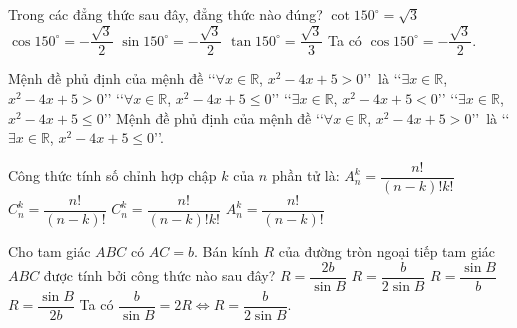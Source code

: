 \begin{ex}
\begin{ex}%
	Trong các đẳng thức sau đây, đẳng thức nào đúng?
	\choice
	{$\cot 150^\circ=\sqrt 3$}
	{\True $\cos 150^\circ=-\dfrac{\sqrt 3}{2}$}
	{$\sin 150^\circ=-\dfrac{\sqrt 3}{2}$}
	{$\tan 150^\circ=\dfrac{\sqrt 3}{3}$}
	\loigiai
	{
		Ta có $\cos 150^\circ=-\dfrac{\sqrt 3}{2}$.
	}
\end{ex}

\begin{ex}%
	Mệnh đề phủ định của mệnh đề \lq\lq $\forall x\in\mathbb{R}$, $x^2-4x+5>0$\rq\rq\ là
	\choice
	{\lq\lq $\exists x\in\mathbb{R}$, $x^2-4x+5>0$\rq\rq}
	{\lq\lq $\forall x\in\mathbb{R}$, $x^2-4x+5\leq 0$\rq\rq}
	{\lq\lq $\exists x\in\mathbb{R}$, $x^2-4x+5<0$\rq\rq}
	{\True \lq\lq $\exists x\in\mathbb{R}$, $x^2-4x+5\leq 0$\rq\rq}
	\loigiai
	{
		Mệnh đề phủ định của mệnh đề \lq\lq $\forall x\in\mathbb{R}$, $x^2-4x+5>0$\rq\rq\ là \lq\lq $\exists x\in\mathbb{R}$, $x^2-4x+5\leq 0$\rq\rq.
	}
\end{ex}

\begin{ex}%
Công thức tính số chỉnh hợp chập $k$ của $n$ phần tử là:
\choice
{$A_n^k=\dfrac{n!}{\left(n-k\right)!k!}$}
{$C_n^k=\dfrac{n!}{\left(n-k\right)!}$}
{$C_n^k=\dfrac{n!}{\left(n-k\right)!k!}$}
{\True $A_n^k=\dfrac{n!}{\left(n-k\right)!}$}
\end{ex}
\begin{ex}%
	Cho tam giác $ABC$ có $AC=b$. Bán kính $R$ của đường tròn ngoại tiếp tam giác $ABC$ được tính bởi công thức nào sau đây?
	\choice
	{$R=\dfrac{2b}{\sin B}$}
	{\True $R=\dfrac{b}{2\sin B}$}
	{$R=\dfrac{\sin B}{b}$}
	{$R=\dfrac{\sin B}{2b}$}
	\loigiai
	{
		Ta có $\dfrac{b}{\sin B}=2R \Leftrightarrow R=\dfrac{b}{2\sin B}$.
	}
\end{ex}


\end{ex}
